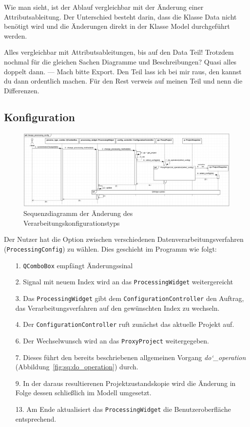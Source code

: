 \documentclass{article}
\begin{document}
Wie man sieht, ist der Ablauf vergleichbar mit der Änderung einer Attributsableitung. Der Unterschied besteht darin, dass die Klasse Data nicht benötigt wird und die Änderungen direkt in der Klasse Model durchgeführt werden.

Alles vergleichbar mit Attributsableitungen, bis auf den Data Teil!
Trotzdem nochmal für die gleichen Sachen Diagramme und Beschreibungen? Quasi alles doppelt dann. --- Mach bitte Export. Den Teil lass ich bei mir raus, den kannst du dann ordentlich machen. Für den Rest verweis auf meinen Teil und nenn die Differenzen.


\subsection{Konfiguration}
\begin{figure}[H]%
    \centering
    \includegraphics[width=13cm]{entwurf/Entwurf_dokument/img/Michael/sd_change_processing_config.png}
    \caption{Sequenzdiagramm der Änderung des Verarbeitungskonfigurationstyps}
\end{figure}

Der Nutzer hat die Option zwischen verschiedenen Datenverarbeitungsverfahren (\texttt{ProcessingConfig}) zu wählen. Dies geschieht im Programm wie folgt:
\begin{enumerate}
    \item[1.] \texttt{QComboBox} empfängt Änderungssinal
    \item[2.] Signal mit neuem Index wird an das \texttt{ProcessingWidget} weitergereicht
    \item[3.] Das \texttt{ProcessingWidget} gibt dem \texttt{ConfigurationController} den Auftrag, das Verarbeitungsverfahren auf den gewünschten Index zu wechseln.
    \item[4.] Der \texttt{ConfigurationController} ruft zunächst das aktuelle Projekt auf.
    \item[6.] Der Wechselwunsch wird an das \texttt{ProxyProject} weitergegeben.
    \item[7.] Dieses führt den bereits beschriebenen allgemeinen Vorgang \emph{do\char`_operation} (Abbildung~\ref{fig:sq:do_operation}) durch.
    \item[9.] In der daraus resultierenen Projektzustandskopie wird die Änderung in Folge dessen schließlich im Modell umgesetzt.
    \item[13.] Am Ende aktualisiert das \texttt{ProcessingWidget} die Benutzeroberfläche entsprechend.
\end{enumerate}
\end{document}
